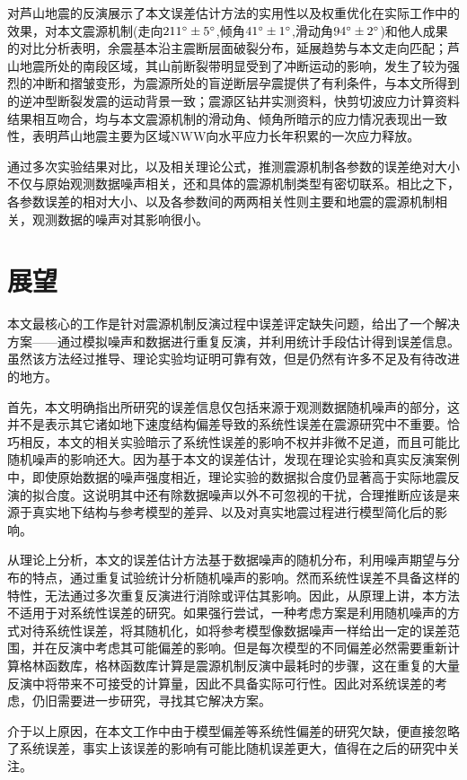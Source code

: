 对芦山地震的反演展示了本文误差估计方法的实用性以及权重优化在实际工作中的效果，对本文震源机制(走向$211^\circ\pm5^\circ$,倾角$41^\circ\pm1^\circ$,滑动角$94^\circ\pm2^\circ$)和他人成果的对比分析表明，余震基本沿主震断层面破裂分布，延展趋势与本文走向匹配；芦山地震所处的南段区域，其山前断裂带明显受到了冲断运动的影响，发生了较为强烈的冲断和摺皱变形，为震源所处的盲逆断层孕震提供了有利条件，与本文所得到的逆冲型断裂发震的运动背景一致；震源区钻井实测资料，快剪切波应力计算资料结果相互吻合，均与本文震源机制的滑动角、倾角所暗示的应力情况表现出一致性，表明芦山地震主要为区域NWW向水平应力长年积累的一次应力释放。

通过多次实验结果对比，以及相关理论公式，推测震源机制各参数的误差绝对大小不仅与原始观测数据噪声相关，还和具体的震源机制类型有密切联系。相比之下，各参数误差的相对大小、以及各参数间的两两相关性则主要和地震的震源机制相关，观测数据的噪声对其影响很小。

\section{展望}
本文最核心的工作是针对震源机制反演过程中误差评定缺失问题，给出了一个解决方案——通过模拟噪声和数据进行重复反演，并利用统计手段估计得到误差信息。虽然该方法经过推导、理论实验均证明可靠有效，但是仍然有许多不足及有待改进的地方。

首先，本文明确指出所研究的误差信息仅包括来源于观测数据随机噪声的部分，这并不是表示其它诸如地下速度结构偏差导致的系统性误差在震源研究中不重要。恰巧相反，本文的相关实验暗示了系统性误差的影响不权并非微不足道，而且可能比随机噪声的影响还大。因为基于本文的误差估计，发现在理论实验和真实反演案例中，即使原始数据的噪声强度相近，理论实验的数据拟合度仍显著高于实际地震反演的拟合度。这说明其中还有除数据噪声以外不可忽视的干扰，合理推断应该是来源于真实地下结构与参考模型的差异、以及对真实地震过程进行模型简化后的影响。

从理论上分析，本文的误差估计方法基于数据噪声的随机分布，利用噪声期望与分布的特点，通过重复试验统计分析随机噪声的影响。然而系统性误差不具备这样的特性，无法通过多次重复反演进行消除或评估其影响。因此，从原理上讲，本方法不适用于对系统性误差的研究。如果强行尝试，一种考虑方案是利用随机噪声的方式对待系统性误差，将其随机化，如将参考模型像数据噪声一样给出一定的误差范围，并在反演中考虑其可能偏差的影响。但是每次模型的不同偏差必然需要重新计算格林函数库，格林函数库计算是震源机制反演中最耗时的步骤，这在重复的大量反演中将带来不可接受的计算量，因此不具备实际可行性。因此对系统误差的考虑，仍旧需要进一步研究，寻找其它解决方案。

介于以上原因，在本文工作中由于模型偏差等系统性偏差的研究欠缺，便直接忽略了系统误差，事实上该误差的影响有可能比随机误差更大，值得在之后的研究中关注。

